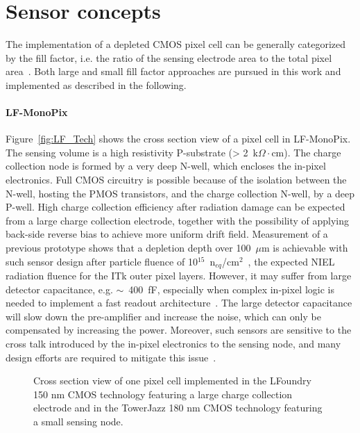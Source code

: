 \documentclass[a4paper,11pt]{article}
\begin{document}

\section{Sensor concepts}
\label{sec:SensorConcepts}

The implementation of a depleted CMOS pixel cell can be generally categorized by the fill factor, i.e. the ratio of the sensing electrode area to the total pixel area~\cite{SiliconPixel_NW}. Both large and small fill factor approaches are pursued in this work and implemented as described in the following.

\paragraph{LF-MonoPix}
Figure~\ref{fig:LF_Tech} shows the cross section view of a pixel cell in LF-MonoPix. The sensing volume is a high resistivity P-substrate (> 2~k$\Omega\cdot$cm). The charge collection node is formed by a very deep N-well, which encloses the in-pixel electronics. Full CMOS circuitry is possible because of the isolation between the N-well, hosting the PMOS transistors, and the charge collection N-well, by a deep P-well. High charge collection efficiency after radiation damage can be expected from a large charge collection electrode, together with the possibility of applying back-side reverse bias to achieve more uniform drift field. Measurement of a previous prototype shows that a depletion depth over 100~$\mu$m is achievable with such sensor design after particle fluence of 10$^{15} $~n$_{eq}$/cm$^{2}$~\cite{LF_Mandić_2017}, the expected NIEL radiation fluence for the ITk outer pixel layers. However, it may suffer from large detector capacitance, e.g. $\sim $~400~fF, especially when complex in-pixel logic is needed to implement a fast readout architecture~\cite{SiliconPixel_NW,MonoPix_TWang_2017}. The large detector capacitance will slow down the pre-amplifier and increase the noise, which can only be compensated by increasing the power. Moreover, such sensors are sensitive to the cross talk introduced by the in-pixel electronics to the sensing node, and many design efforts are required to mitigate this issue~\cite{MonoPix_TWang_2017}.

\begin{figure}[!ht]
  \begin{center}
    \qquad
    \caption[]{Cross section view of one pixel cell implemented  in the LFoundry 150 nm CMOS technology featuring a large charge collection electrode and  in the TowerJazz 180 nm CMOS technology featuring a small sensing node.} 
    \label{fig:Tech}
  \end{center}
\end{figure}
\end{document}
